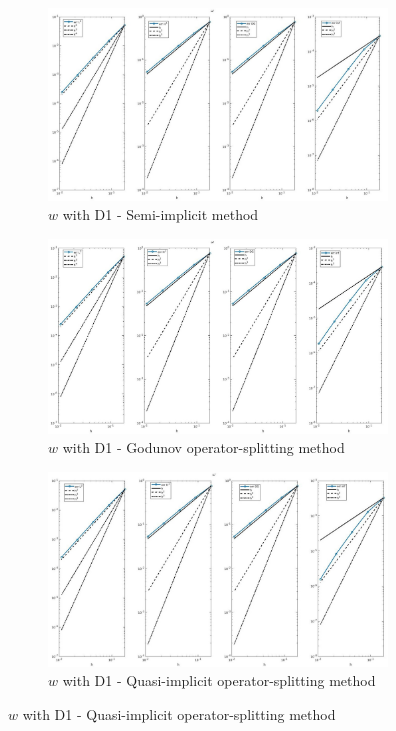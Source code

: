 \documentclass[a4paper,11pt]{article}
\begin{document}
\begin{figure}
\begin{subfigure}{0.5\textwidth}
\includegraphics[width = 9cm]{./D1_w_1.jpg}
\caption*{$w$ with D1 - Semi-implicit method}
\end{subfigure}
\begin{subfigure}{0.5\textwidth}
\includegraphics[width =9cm]{./D1_w_1_GO.jpg}
\caption*{$w$ with D1 - Godunov operator-splitting method}
\end{subfigure}
\begin{center}
\begin{subfigure}{0.5\textwidth}
\includegraphics[width =9cm]{./D1_w_1_OS.jpg}
\caption*{$w$ with D1 - Quasi-implicit operator-splitting method}
\end{subfigure}
\end{center}
\end{figure}
\restoregeometry
\newpage
\end{document}
